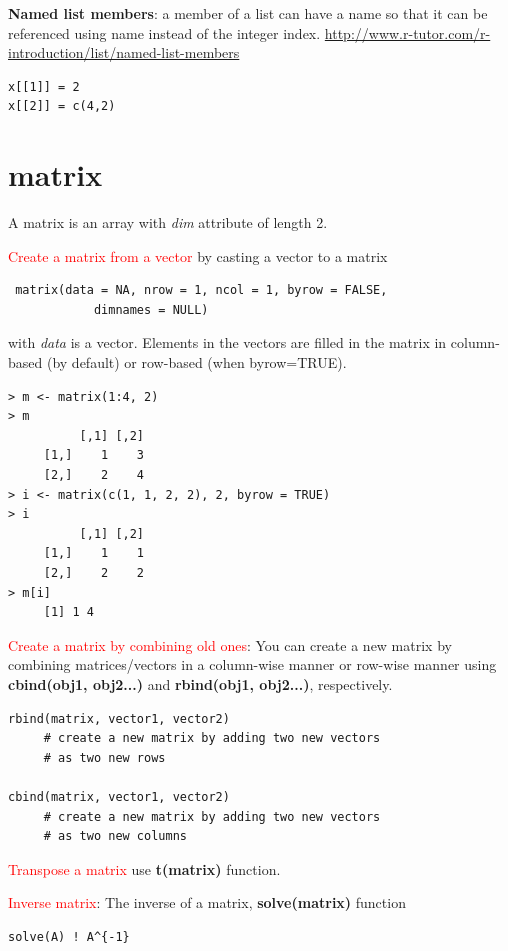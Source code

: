{\bf Named list members}: a member of a list can have a name so that it can be
referenced using name instead of the integer index.
\url{http://www.r-tutor.com/r-introduction/list/named-list-members}


\begin{lstlisting}
x[[1]] = 2
x[[2]] = c(4,2)
\end{lstlisting}


\section{matrix}
\label{sec:matrix}

A matrix is an array with {\it dim} attribute of length 2.


\textcolor{red}{Create a matrix from a vector} by casting a vector to
a matrix
\begin{lstlisting}
 matrix(data = NA, nrow = 1, ncol = 1, byrow = FALSE,
            dimnames = NULL)
\end{lstlisting}
with {\it data} is a vector. Elements in the vectors are filled in the
matrix in column-based (by default) or row-based (when byrow=TRUE).
\begin{lstlisting}
> m <- matrix(1:4, 2)
> m
          [,1] [,2]
     [1,]    1    3
     [2,]    2    4
> i <- matrix(c(1, 1, 2, 2), 2, byrow = TRUE)
> i
          [,1] [,2]
     [1,]    1    1
     [2,]    2    2
> m[i]
     [1] 1 4
\end{lstlisting}

\textcolor{red}{Create a matrix by combining old ones}: You can create
a new matrix by combining matrices/vectors in a column-wise manner or
row-wise manner using {\bf cbind(obj1, obj2...)} and {\bf rbind(obj1,
  obj2...)}, respectively. 

\begin{lstlisting}
rbind(matrix, vector1, vector2)
     # create a new matrix by adding two new vectors 
     # as two new rows

cbind(matrix, vector1, vector2)
     # create a new matrix by adding two new vectors 
     # as two new columns
\end{lstlisting}

\textcolor{red}{Transpose a matrix} use {\bf t(matrix)} function.

\textcolor{red}{Inverse matrix}: The inverse of a matrix, {\bf
  solve(matrix)} function 
\begin{lstlisting}
solve(A) ! A^{-1}
\end{lstlisting}

